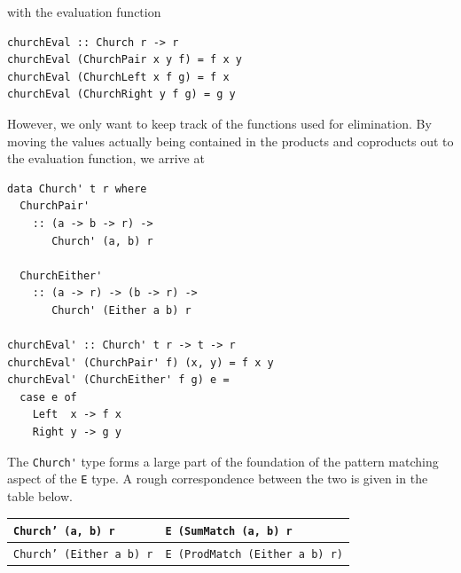 \documentclass[sigplan,anonymous,review]{acmart}
\newcommand{\ttt}{\texttt}
\newcommand{\showtodos}{}  %
\newenvironment{todo}
  {\ifthenelse{\isundefined{\showtodos}}{\comment}{\begin{tcolorbox}
    \textbf{TODO}:}}
  {\ifthenelse{\isundefined{\showtodos}}{\endcomment}{\end{tcolorbox}}
  }
\begin{document}
with the evaluation function

\begin{lstlisting}
churchEval :: Church r -> r
churchEval (ChurchPair x y f) = f x y
churchEval (ChurchLeft x f g) = f x
churchEval (ChurchRight y f g) = g y
\end{lstlisting}

However, we only want to keep track of the functions used for elimination. By moving
the values actually being contained in the products and coproducts out to the
evaluation function, we arrive at

\begin{lstlisting}
data Church' t r where
  ChurchPair'
    :: (a -> b -> r) ->
       Church' (a, b) r

  ChurchEither'
    :: (a -> r) -> (b -> r) ->
       Church' (Either a b) r

churchEval' :: Church' t r -> t -> r
churchEval' (ChurchPair' f) (x, y) = f x y
churchEval' (ChurchEither' f g) e =
  case e of
    Left  x -> f x
    Right y -> g y
\end{lstlisting}

The \verb|Church'| type forms a large part of the foundation of the pattern
matching aspect of the \verb|E| type. A rough correspondence between the two
is given in the table below.\\

{\small
\noindent\begin{tabular}{|p{3.4cm}|p{4.4cm}|}
  \hline
  \ttt{Church' (a, b) r} & \ttt{E (SumMatch (a, b) r} \\
  \hline
  \ttt{Church' (Either a b) r} & \ttt{E (ProdMatch (Either a b) r)}\\
  \hline
\end{tabular}
}




\end{document}
